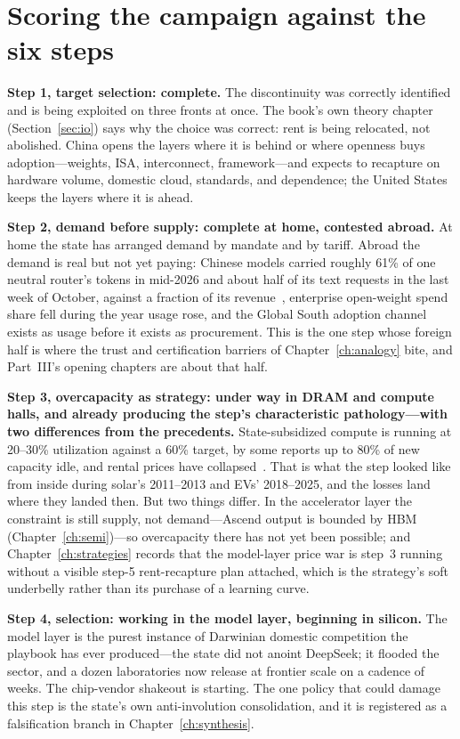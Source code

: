 \section{Scoring the campaign against the six steps}

\textbf{Step 1, target selection: complete.} The discontinuity was correctly identified and is being exploited on three fronts at once. The book's own theory chapter (Section~\ref{sec:io}) says why the choice was correct: rent is being relocated, not abolished. China opens the layers where it is behind or where openness buys adoption---weights, ISA, interconnect, framework---and expects to recapture on hardware volume, domestic cloud, standards, and dependence; the United States keeps the layers where it is ahead.

\textbf{Step 2, demand before supply: complete at home, contested abroad.} At home the state has arranged demand by mandate and by tariff. Abroad the demand is real but not yet paying: Chinese models carried roughly 61\% of one neutral router's tokens in mid-2026 and about half of its text requests in the last week of October, against a fraction of its revenue~\cite{openrouter-2026,volume-revenue,mdl-openrouter-oct26}, enterprise open-weight spend share fell during the year usage rose, and the Global South adoption channel exists as usage before it exists as procurement. This is the one step whose foreign half is where the trust and certification barriers of Chapter~\ref{ch:analogy} bite, and Part~III's opening chapters are about that half.

\textbf{Step 3, overcapacity as strategy: under way in DRAM and compute halls, and already producing the step's characteristic pathology---with two differences from the precedents.} State-subsidized compute is running at 20--30\% utilization against a 60\% target, by some reports up to 80\% of new capacity idle, and rental prices have collapsed~\cite{china-idle,china-idle-dc}. That is what the step looked like from inside during solar's 2011--2013 and EVs' 2018--2025, and the losses land where they landed then. But two things differ. In the accelerator layer the constraint is still supply, not demand---Ascend output is bounded by HBM (Chapter~\ref{ch:semi})---so overcapacity there has not yet been possible; and Chapter~\ref{ch:strategies} records that the model-layer price war is step~3 running without a visible step-5 rent-recapture plan attached, which is the strategy's soft underbelly rather than its purchase of a learning curve.

\textbf{Step 4, selection: working in the model layer, beginning in silicon.} The model layer is the purest instance of Darwinian domestic competition the playbook has ever produced---the state did not anoint DeepSeek; it flooded the sector, and a dozen laboratories now release at frontier scale on a cadence of weeks. The chip-vendor shakeout is starting. The one policy that could damage this step is the state's own anti-involution consolidation, and it is registered as a falsification branch in Chapter~\ref{ch:synthesis}.

